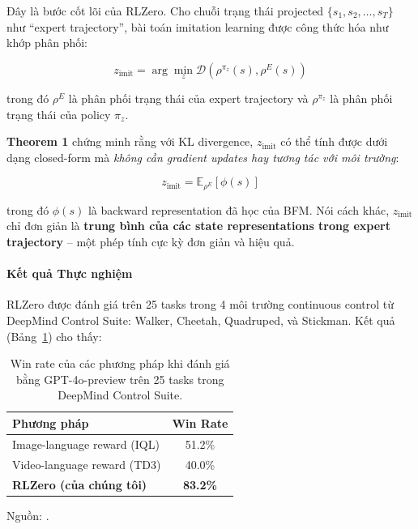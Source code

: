 Đây là bước cốt lõi của RLZero. Cho chuỗi trạng thái projected
$\{s_1, s_2, \ldots, s_T\}$ như ``expert trajectory'', bài toán
imitation learning được công thức hóa như khớp phân phối:

\begin{equation}
    z_{\text{imit}} = \arg\min_z \mathcal{D}(\rho^{\pi_z}(s),
    \rho^E(s))
    \label{eq:imitation}
\end{equation}

trong đó $\rho^E$ là phân phối trạng thái của expert trajectory và
$\rho^{\pi_z}$ là phân phối trạng thái của policy $\pi_z$.

\textbf{Theorem 1} \cite{sikchi2025rlzero} chứng minh rằng với KL
divergence, $z_{\text{imit}}$ có thể tính được dưới dạng closed-form
mà \textit{không cần gradient updates hay tương tác với môi trường}:

\begin{equation}
    z_{\text{imit}} = \mathbb{E}_{\rho^E}[\phi(s)]
    \label{eq:zimit}
\end{equation}

trong đó $\phi(s)$ là backward representation đã học của BFM. Nói cách
khác, $z_{\text{imit}}$ chỉ đơn giản là \textbf{trung bình của các
state representations trong expert trajectory} -- một phép tính cực
kỳ đơn giản và hiệu quả.

\paragraph{Kết quả Thực nghiệm}

RLZero được đánh giá trên 25 tasks trong 4 môi trường continuous
control từ DeepMind Control Suite: Walker, Cheetah, Quadruped, và
Stickman. Kết quả (Bảng~\ref{tab:rlzero_results}) cho thấy:

\begin{table}[H]
    \centering
    \caption{Win rate của các phương pháp khi đánh giá bằng GPT-4o-preview
    trên 25 tasks trong DeepMind Control Suite.}
    \label{tab:rlzero_results}
    \begin{tabular}{lc}
        \toprule
        \textbf{Phương pháp} & \textbf{Win Rate} \\
        \midrule
        Image-language reward (IQL)  & 51.2\% \\
        Video-language reward (TD3)  & 40.0\% \\
        \textbf{RLZero (của chúng tôi)} & \textbf{83.2\%} \\
        \bottomrule
    \end{tabular}
\end{table}
Nguồn: \cite{sikchi2025rlzero}.

